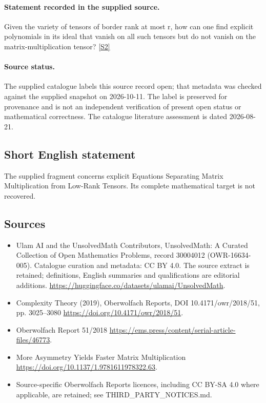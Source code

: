 \documentclass[11pt]{article}
\newcommand{\sref}[2]{\hyperlink{source:#1:#2}{[S#2]}}
\begin{document}
\paragraph{Statement recorded in the supplied source.}
Given the variety of tensors of border rank at most r, how can one find explicit polynomials in its ideal that vanish on all such tensors but do not vanish on the matrix-multiplication tensor? \sref{30004012}{2}
\paragraph{Source status.}
The supplied catalogue labels this source record open; that metadata was checked against the supplied snapshot on 2026-10-11. The label is preserved for provenance and is not an independent verification of present open status or mathematical correctness. The catalogue literature assessment is dated 2026-08-21.
\subsection{Short English statement}
The supplied fragment concerns explicit Equations Separating Matrix Multiplication from Low-Rank Tensors. Its complete mathematical target is not recovered.
\subsection{Sources}
\begin{itemize}
\item[\hypertarget{source:30004012:1}{S1}] Ulam AI and the UnsolvedMath Contributors, UnsolvedMath: A Curated Collection of Open Mathematics Problems, record 30004012 (OWR-16634-005). Catalogue curation and metadata: CC BY 4.0. The source extract is retained; definitions, English summaries and qualifications are editorial additions.
\url{https://huggingface.co/datasets/ulamai/UnsolvedMath}.
\item[\hypertarget{source:30004012:2}{S2}] Complexity Theory (2019), Oberwolfach Reports, DOI 10.4171/owr/2018/51, pp. 3025--3080
\url{https://doi.org/10.4171/owr/2018/51}.
\item[\hypertarget{source:30004012:3}{S3}] Oberwolfach Report 51/2018
\url{https://ems.press/content/serial-article-files/46773}.
\item[\hypertarget{source:30004012:4}{S4}] More Asymmetry Yields Faster Matrix Multiplication
\url{https://doi.org/10.1137/1.9781611978322.63}.
\item Source-specific Oberwolfach Reports licences, including CC BY-SA 4.0 where applicable, are retained; see THIRD\_PARTY\_NOTICES.md.
\end{itemize}
\end{document}
